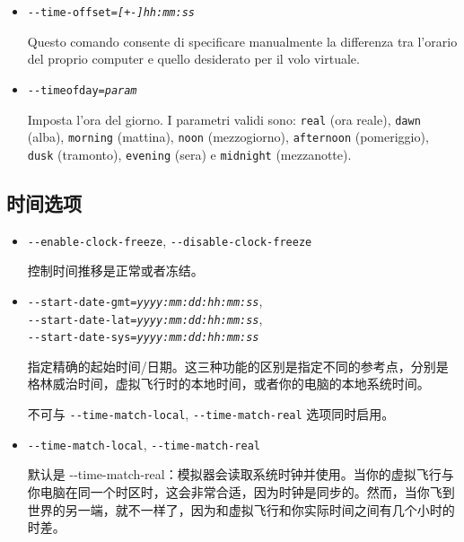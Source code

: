 {\begin{itemize}
  \item{\texttt{-$ $-time-offset={\it [+-]hh:mm:ss}}}

  Questo comando consente di specificare manualmente la differenza tra
  l'orario del proprio computer e quello desiderato per il volo virtuale.

  \item{\texttt{-$ $-timeofday={\it param}}}

  Imposta l'ora del giorno. I parametri validi sono: \texttt{real} (ora reale),
  \texttt{dawn} (alba), \texttt{morning} (mattina),
  \texttt{noon} (mezzogiorno), \texttt{afternoon} (pomeriggio),
  \texttt{dusk} (tramonto), \texttt{evening} (sera) e \texttt{midnight} (mezzanotte).

  \end{itemize}
}
\ifchinese
{
  \subsection{时间选项}
\begin{itemize}

  \item{\texttt{-$ $-enable-clock-freeze}, \texttt{-$ $-disable-clock-freeze}}

   控制时间推移是正常或者冻结。
 
\item{\texttt{-$ $-start-date-gmt={\it yyyy:mm:dd:hh:mm:ss}},\\
  \texttt{-$ $-start-date-lat={\it yyyy:mm:dd:hh:mm:ss}},\\
  \texttt{-$ $-start-date-sys={\it yyyy:mm:dd:hh:mm:ss}}}

  指定精确的起始时间/日期。这三种功能的区别是指定不同的参考点，分别是格林威治时间，虚拟飞行时的本地时间，或者你的电脑的本地系统时间。

  不可与 \texttt{-$ $-time-match-local}, \texttt{-$ $-time-match-real} 选项同时启用。

\item{\texttt{-$ $-time-match-local}, \texttt{-$ $-time-match-real}}

  默认是 {-$ $-time-match-real}：模拟器会读取系统时钟并使用。当你的虚拟飞行与你电脑在同一个时区时，这会非常合适，因为时钟是同步的。然而，当你飞到世界的另一端，就不一样了，因为和虚拟飞行和你实际时间之间有几个小时的时差。


\end{itemize}}
